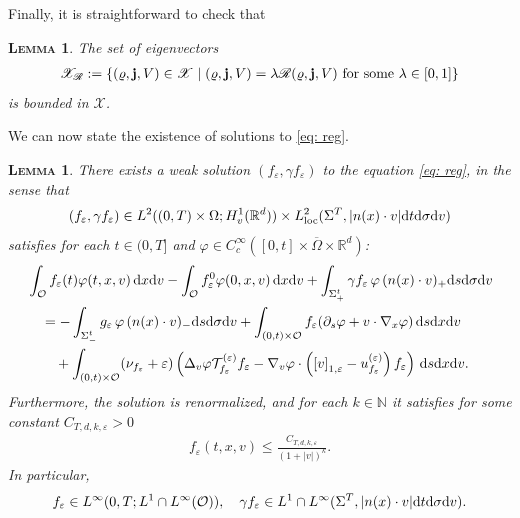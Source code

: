 \documentclass[10pt, reqno]{amsart}
\theoremstyle{plain}
\newtheorem{lemma}[theorem]{\normalfont \scshape Lemma}
\theoremstyle{definition}
\theoremstyle{remark}
\numberwithin{equation}{section}
\newcommand{\bfj}{{\bf j}}
\newcommand{\bbN}{\mathbb N}
\newcommand{\calO}{\mathcal O}
\newcommand{\calT}{\mathcal T}
\newcommand{\scrR}{\mathscr R}
\newcommand{\scrX}{\mathscr X}
\newcommand{\p}{\partial}
\newcommand{\R}{\mathbb{R}}
\newcommand{\ve}{\varepsilon}
\newcommand{\dx}{\textnormal{d}x}
\newcommand{\dv}{\textnormal{d}v}
\newcommand{\dt}{\textnormal{d}t}
\newcommand{\ds}{\textnormal{d}s}
\newcommand{\tnd}{\textnormal{d}}
\newcommand{\lt}{\left}
\newcommand{\rt}{\right}
\newcommand{\renorm}[3]{\lt[#1\rt]_{#2 , #3}}
\begin{document}
Finally, it is straightforward to check that

\begin{lemma} \label{lem: R eigen}
    The set of eigenvectors
    \begin{align*}
        \scrX_\scrR := \lt\{(\varrho, \bfj, V)\in \scrX \; \middle| \; (\varrho, \bfj, V) = \lambda \mathscr{R}(\varrho, \bfj, V) \text{ for some }\lambda\in [0,1] \rt\}
    \end{align*}
    is bounded in $\scrX$.
\end{lemma}

We can now state the existence of solutions to \eqref{eq: reg}.

\begin{lemma} \label{lem: ve weak sol}
    There exists a weak solution $(f_\ve, \gamma f_\ve)$ to the equation \eqref{eq: reg}, in the sense that
    \begin{align*}
        (f_\ve, \gamma f_\ve) \in L^2((0,T)\times \Omega; H^1_v(\R^d)) \times L^2_{\rm loc}(\Sigma^T, |n(x)\cdot v| \dt\tnd\sigma\dv)
    \end{align*}
    satisfies for each $t\in (0,T]$ and $\varphi\in C_c^\infty([0,t]\times\overline\Omega\times\R^d)$:
    \begin{equation*}
    \begin{split}
    &\int_{\calO} f_\ve(t) \varphi(t,x,v) \,\dx\dv - \int_{\calO} f_\ve^0 \varphi(0,x,v)\,\dx\dv + \int_{\Sigma_+^t} \gamma f_\ve \, \varphi \, (n(x)\cdot v)_+ \ds\tnd\sigma\dv\\
    &\quad = - \int_{\Sigma_-^t} g_\ve \, \varphi \, (n(x)\cdot v)_- \ds\tnd\sigma\dv +\int_{(0,t)\times \calO} f_\ve (\p_s \varphi + v\cdot \nabla_x \varphi) \,\ds\dx\dv\\
    &\qquad + \int_{(0,t)\times \calO} (\nu_{f_\ve} + \ve) \lt(\Delta_v \varphi \calT_{f_\ve}^{(\ve)} f_\ve - \nabla_v\varphi \cdot \lt(\renorm{v}{1}{\ve}-u_{f_\ve}^{(\ve)} \rt) f_\ve \rt) \,\ds\dx\dv.
    \end{split}
    \end{equation*}
    Furthermore, the solution is renormalized, and for each $k\in \bbN$ it satisfies for some constant $C_{T,d,k,\ve}>0$
    \begin{align}\label{eq: ve decay}
        f_\ve(t,x,v) \le \frac{C_{T,d,k,\ve}}{(1+|v|)^k}.
    \end{align}
    In particular,
    \begin{equation}\label{eq: ve memberships}
    \begin{split}
        f_\ve \in L^\infty(0,T; L^1\cap L^\infty(\calO)),  \quad \gamma f_\ve \in L^1 \cap L^\infty (\Sigma^T, |n(x)\cdot v| \dt \tnd\sigma \dv).
        \end{split}
    \end{equation}
\end{lemma}
\end{document}
